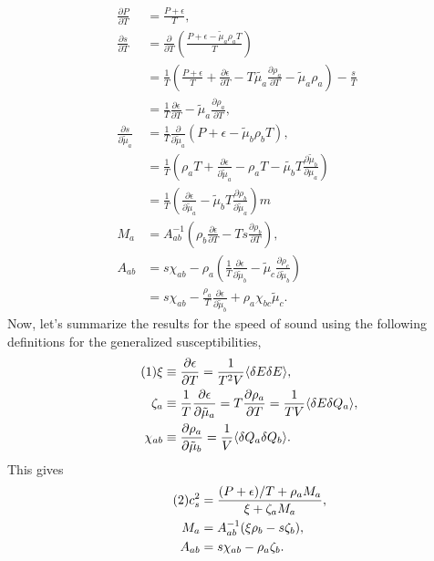 \documentclass[12pt]{article}
\numberwithin{equation}{section}
\numberwithin{figure}{section}
\newcommand\eqnumber{\addtocounter{equation}{1}\tag{\theequation}}
\begin{document}
\begin{align*}
\frac{\partial P}{\partial T}&=\frac{P+\epsilon}{T},\\
\frac{\partial s}{\partial T}&=\frac{\partial}{\partial T}\left(\frac{P+\epsilon-\tilde\mu_a\rho_aT}{T}\right)\\
&=\frac{1}{T}\left(\frac{P+\epsilon}{T}+\frac{\partial\epsilon}{\partial T}-T\tilde{\mu_a}\frac{\partial\rho_a}{\partial T}-\tilde{\mu}_a\rho_a\right)-\frac{s}{T}\\
&=\frac{1}{T}\frac{\partial\epsilon}{\partial T}-\tilde{\mu}_a\frac{\partial\rho_a}{\partial T},\\
\frac{\partial s}{\partial\tilde{\mu}_a}&=\frac{1}{T}\frac{\partial}{\partial\tilde{\mu}_a}(P+\epsilon-\tilde{\mu}_b\rho_bT),\\
&=\frac{1}{T}\left(
\rho_aT+\frac{\partial\epsilon}{\partial\tilde{\mu}_a}-\rho_aT-\tilde{\mu_b}T\frac{\partial\tilde{\mu}_b}{\partial\mu_a}
\right)\\
&=\frac{1}{T}\left(
\frac{\partial\epsilon}{\partial\tilde{\mu}_a}-\tilde{\mu}_bT\frac{\partial\rho_b}{\partial\tilde{\mu}_a}
\right)m\\
M_a&=A^{-1}_{ab}\left(
\rho_b\frac{\partial\epsilon}{\partial T}-Ts\frac{\partial\rho_b}{\partial T}\right),\\
A_{ab}&=s\chi_{ab}-\rho_a\left(
\frac{1}{T}\frac{\partial\epsilon}{\partial\tilde{\mu}_b}-\tilde{\mu}_c\frac{\partial\rho_c}{\partial\tilde{\mu}_b}
\right)\\
&=s\chi_{ab}-\frac{\rho_a}{T}\frac{\partial\epsilon}{\partial\tilde{\mu}_b}+\rho_a\chi_{bc}\tilde{\mu}_c.
\end{align*}
Now, let's summarize the results for the speed of sound using the following definitions for the generalized susceptibilities,
\begin{align*}\eqnumber
\xi&\equiv \frac{\partial\epsilon}{\partial T}=\frac{1}{T^2V}\langle\delta E\delta E\rangle,\\
\zeta_a&\equiv\frac{1}{T}\frac{\partial\epsilon}{\partial\tilde{\mu}_a}=T\frac{\partial\rho_a}{\partial T}
=\frac{1}{TV}\langle\delta E\delta Q_a\rangle,\\
\chi_{ab}&\equiv\frac{\partial\rho_a}{\partial\tilde{\mu}_b}=\frac{1}{V}\langle\delta Q_a\delta Q_b\rangle.
\end{align*}
This gives
\begin{align*}\eqnumber\label{eq:f12}
c_s^2&=\frac{(P+\epsilon)/T+\rho_a M_a}{\xi+\zeta_aM_a},\\
M_a&=A^{-1}_{ab}(\xi\rho_b-s\zeta_b),\\
A_{ab}&=s\chi_{ab}-\rho_a\zeta_b.
\end{align*}
\end{document}
